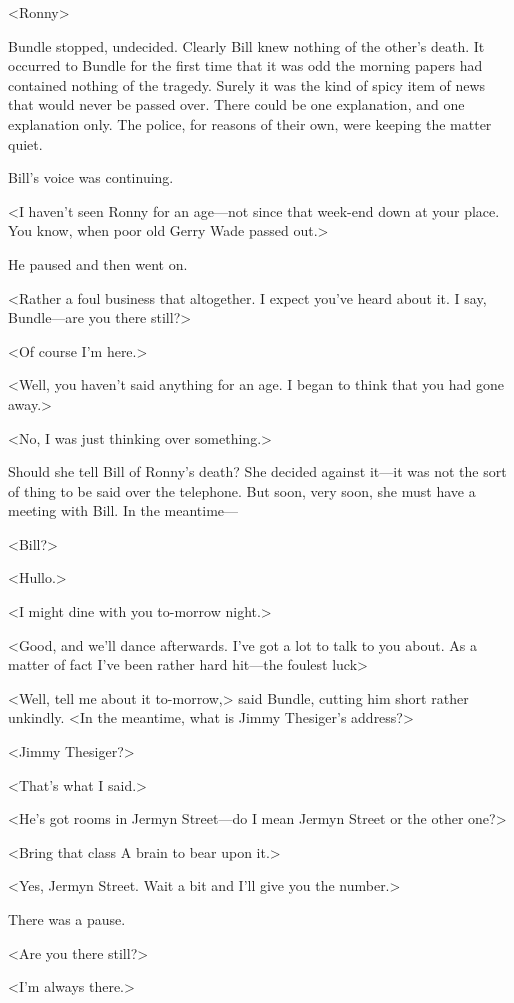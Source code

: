 <Ronny\longdash>

Bundle stopped, undecided. Clearly Bill knew nothing of the other's death. It occurred to Bundle for the first time that it was odd the morning papers had contained nothing of the tragedy. Surely it was the kind of spicy item of news that would never be passed over. There could be one explanation, and one explanation only. The police, for reasons of their own, were keeping the matter quiet.

Bill's voice was continuing.

<I haven't seen Ronny for an age—not since that week-end down at your place. You know, when poor old Gerry Wade passed out.>

He paused and then went on.

<Rather a foul business that altogether. I expect you've heard about it. I say, Bundle—are you there still?>

<Of course I'm here.>

<Well, you haven't said anything for an age. I began to think that you had gone away.>

<No, I was just thinking over something.>

Should she tell Bill of Ronny's death? She decided against it—it was not the sort of thing to be said over the telephone. But soon, very soon, she must have a meeting with Bill. In the meantime—

<Bill?>

<Hullo.>

<I might dine with you to-morrow night.>

<Good, and we'll dance afterwards. I've got a lot to talk to you about. As a matter of fact I've been rather hard hit—the foulest luck\longdash>

<Well, tell me about it to-morrow,> said Bundle, cutting him short rather unkindly. <In the meantime, what is Jimmy Thesiger's address?>

<Jimmy Thesiger?>

<That's what I said.>

<He's got rooms in Jermyn Street—do I mean Jermyn Street or the other one?>

<Bring that class A brain to bear upon it.>

<Yes, Jermyn Street. Wait a bit and I'll give you the number.>

There was a pause.

<Are you there still?>

<I'm always there.>

